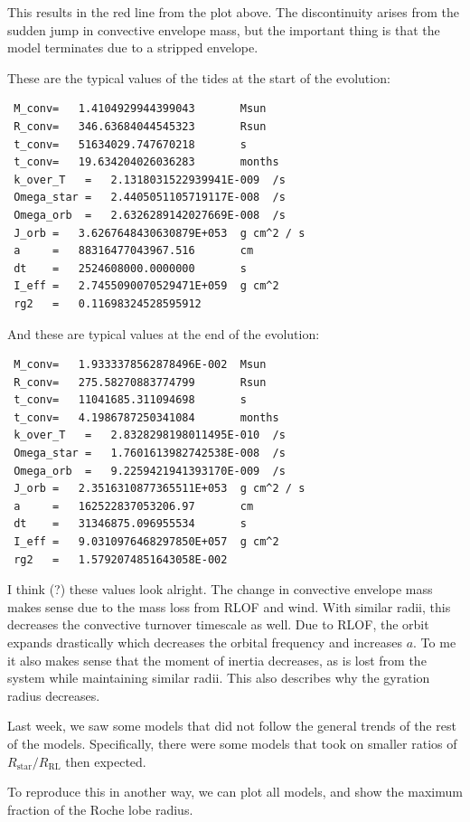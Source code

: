 \documentclass[a4paper,10pt]{article}
\begin{document}
This results in the red line from the plot above. The discontinuity arises from the sudden jump in convective envelope mass, but the important thing is that the model terminates due to a stripped envelope.

These are the typical values of the tides at the start of the evolution:
\begin{verbatim}
 M_conv=   1.4104929944399043       Msun
 R_conv=   346.63684044545323       Rsun
 t_conv=   51634029.747670218       s
 t_conv=   19.634204026036283       months
 k_over_T   =   2.1318031522939941E-009  /s
 Omega_star =   2.4405051105719117E-008  /s
 Omega_orb  =   2.6326289142027669E-008  /s
 J_orb =   3.6267648430630879E+053  g cm^2 / s
 a     =   88316477043967.516       cm
 dt    =   2524608000.0000000       s
 I_eff =   2.7455090070529471E+059  g cm^2
 rg2   =   0.11698324528595912
\end{verbatim}
And these are typical values at the end of the evolution:
\begin{verbatim}
 M_conv=   1.9333378562878496E-002  Msun
 R_conv=   275.58270883774799       Rsun
 t_conv=   11041685.311094698       s
 t_conv=   4.1986787250341084       months
 k_over_T   =   2.8328298198011495E-010  /s
 Omega_star =   1.7601613982742538E-008  /s
 Omega_orb  =   9.2259421941393170E-009  /s
 J_orb =   2.3516310877365511E+053  g cm^2 / s
 a     =   162522837053206.97       cm
 dt    =   31346875.096955534       s
 I_eff =   9.0310976468297850E+057  g cm^2
 rg2   =   1.5792074851643058E-002
\end{verbatim}
I think (?) these values look alright. The change in convective envelope mass makes sense due to the mass loss from RLOF and wind. With similar radii, this decreases the convective turnover timescale as well. Due to RLOF, the orbit expands drastically which decreases the orbital frequency and increases \(a\). To me it also makes sense that the moment of inertia decreases, as is lost from the system while maintaining similar radii. This also describes why the gyration radius decreases.



Last week, we saw some models that did not follow the general trends of the rest of the models. Specifically, there were some models that took on smaller ratios of \(R_\text{star} / R_\text{RL}\) then expected. 

To reproduce this in another way, we can plot all models, and show the maximum fraction of the Roche lobe radius.
\begin{figure}[ht]
    \centering
\end{figure}
\end{document}
